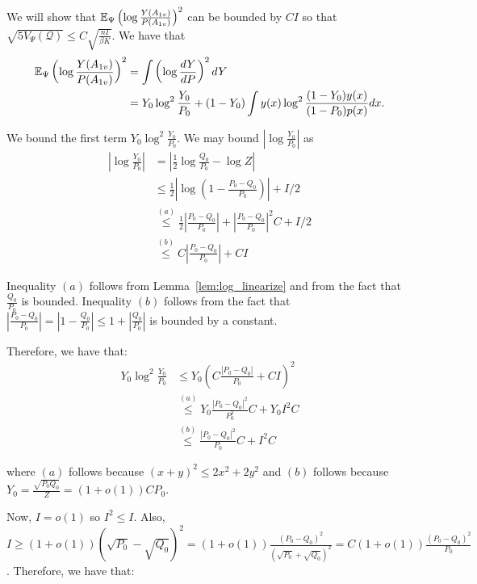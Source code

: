\documentclass{article}
\begin{document}
We will show that ${\mathbb E}_{\Psi} \left( \log \frac{Y(A_{1v})}{P(A_{1v})} \right)^2$ can be bounded by $C I$ so that $\sqrt{ 5 V_{\Psi}(\mathcal{Q})} \leq C \sqrt{\frac{nI}{\beta K}} $. We have that
\begin{align}
{\mathbb E}_{\Psi} \left( \log \frac{Y(A_{1v})}{P(A_{1v})} \right)^2 &= 
    \int \left( \log \frac{dY}{dP} \right)^2 dY \nonumber \\
  &= Y_0 \log^2 \frac{Y_0}{P_0} + (1-Y_0) \int y(x) \log^2 \frac{(1-Y_0) y(x)}{(1-P_0)p(x)} dx. \label{eqn:lower_bound_var_terms}
\end{align}

We bound the first term $Y_0 \log^2 \frac{Y_0}{P_0}$. We may bound $\left| \log \frac{Y_0}{P_0} \right|$ as 
\begin{align*}
\left| \log \frac{Y_0}{P_0} \right|&= \left| \frac{1}{2} \log \frac{Q_0}{P_0} - \log Z \right| \\
    &\leq \frac{1}{2} \left| \log \left( 1 - \frac{P_0 - Q_0}{P_0} \right) \right| + I/2 \\ 
   & \stackrel{(a)} \leq \frac{1}{2} \left| \frac{P_0 - Q_0 }{P_0} \right| + \left| \frac{P_0 - Q_0}{P_0} \right|^2 C + I/2 \\   
   & \stackrel{(b)} \leq C \left| \frac{P_0 - Q_0}{P_0} \right| + C I 
\end{align*}

Inequality $(a)$ follows from Lemma~\ref{lem:log_linearize} and from the fact that $\frac{Q_0}{P_0}$ is bounded. Inequality $(b)$ follows from the fact that $\left| \frac{ P_0 - Q_0}{P_0} \right| = \left| 1 - \frac{Q_0}{P_0} \right| \leq 1 + \left| \frac{Q_0}{P_0} \right|$ is bounded by a constant. 

Therefore, we have that:
\begin{align*}
Y_0 \log^2 \frac{Y_0}{P_0} &\leq Y_0 \left( C \frac{ |P_0 - Q_0| }{P_0} + C I \right)^2 \\
     &\stackrel{(a)} \leq Y_0 \frac{|P_0 - Q_0|^2}{P_0^2 } C + Y_0 I^2 C \\
     &\stackrel{(b)} \leq \frac{|P_0 - Q_0|^2}{P_0} C + I^2 C 
\end{align*}

where $(a)$ follows because $(x + y)^2 \leq 2x^2 + 2y^2$ and $(b)$ follows because $Y_0 = \frac{\sqrt{P_0 Q_0}}{Z} = (1+o(1)) C P_0$. 

Now, $I = o(1)$ so $I^2 \leq I$. Also, $I \geq (1+o(1)) ( \sqrt{P_0} - \sqrt{Q_0})^2 = (1+o(1)) \frac{ (P_0 - Q_0)^2}{(\sqrt{P_0} + \sqrt{Q_0})^2} = C (1 + o(1)) \frac{ (P_0 - Q_0)^2 }{P_0}$. Therefore, we have that:
\end{document}
